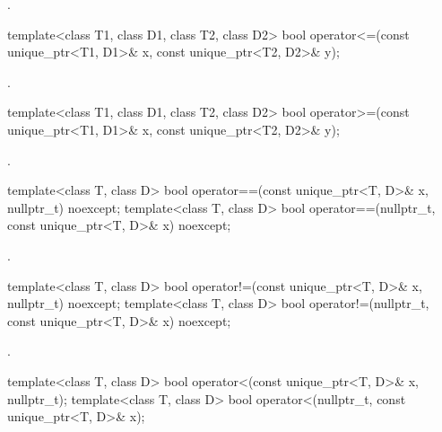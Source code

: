 \begin{itemdescr}
\pnum
\returns {}.
\end{itemdescr}

%
\begin{itemdecl}
template<class T1, class D1, class T2, class D2>
  bool operator<=(const unique_ptr<T1, D1>& x, const unique_ptr<T2, D2>& y);
\end{itemdecl}

\begin{itemdescr}
\pnum
\returns {}.
\end{itemdescr}

%
\begin{itemdecl}
template<class T1, class D1, class T2, class D2>
  bool operator>=(const unique_ptr<T1, D1>& x, const unique_ptr<T2, D2>& y);
\end{itemdecl}

\begin{itemdescr}
\pnum
\returns {}.
\end{itemdescr}

%
\begin{itemdecl}
template<class T, class D>
  bool operator==(const unique_ptr<T, D>& x, nullptr_t) noexcept;
template<class T, class D>
  bool operator==(nullptr_t, const unique_ptr<T, D>& x) noexcept;
\end{itemdecl}

\begin{itemdescr}
\pnum
\returns {}.
\end{itemdescr}

%
\begin{itemdecl}
template<class T, class D>
  bool operator!=(const unique_ptr<T, D>& x, nullptr_t) noexcept;
template<class T, class D>
  bool operator!=(nullptr_t, const unique_ptr<T, D>& x) noexcept;
\end{itemdecl}

\begin{itemdescr}
\pnum
\returns {}.
\end{itemdescr}

%
\begin{itemdecl}
template<class T, class D>
  bool operator<(const unique_ptr<T, D>& x, nullptr_t);
template<class T, class D>
  bool operator<(nullptr_t, const unique_ptr<T, D>& x);
\end{itemdecl}

